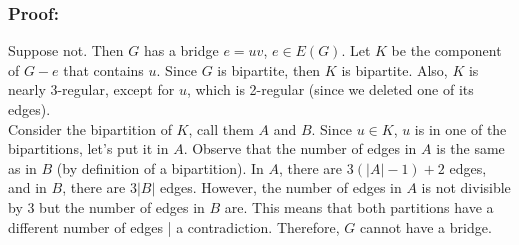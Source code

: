 \documentclass{report}
\begin{document}
\subsubsection{Proof:}
Suppose not. Then $G$ has a bridge $e = uv$, $e \in E(G)$. Let $K$ be the component of $G-e$ that contains $u$. Since $G$ is bipartite, then $K$ is bipartite. Also, $K$ is nearly 3-regular, except for $u$, which is 2-regular (since we deleted one of its edges).\\
Consider the bipartition of $K$, call them $A$ and $B$. Since $u \in K$, $u$ is in one of the bipartitions, let's put it in $A$. Observe that the number of edges in $A$ is the same as in $B$ (by definition of a bipartition). In $A$, there are $3(\vert A \vert - 1) + 2$ edges, and in $B$, there are $3\vert B \vert$ edges. However, the number of edges in $A$ is not divisible by 3 but the number of edges in $B$ are. This means that both partitions have a different number of edges | a contradiction. Therefore, $G$ cannot have a bridge.
\end{document}
